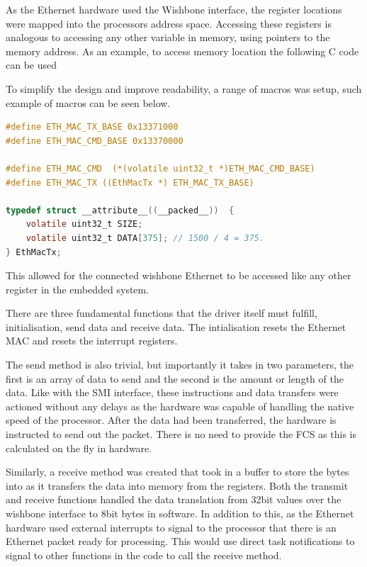As the Ethernet hardware used the Wishbone interface, the register locations were mapped into the processors address space. Accessing these registers is analogous to accessing any other variable in memory, using pointers to the memory address. As an example, to access memory location  the following C code can be used 


To simplify the design and improve readability, a range of macros was setup, such example of macros can be seen below. 

\begin{lstlisting}[language=C, caption=Python example]
#define ETH_MAC_TX_BASE 0x13371000
#define ETH_MAC_CMD_BASE 0x13370000

#define ETH_MAC_CMD  (*(volatile uint32_t *)ETH_MAC_CMD_BASE)
#define ETH_MAC_TX ((EthMacTx *) ETH_MAC_TX_BASE)

typedef struct __attribute__((__packed__))  {
    volatile uint32_t SIZE;
    volatile uint32_t DATA[375]; // 1500 / 4 = 375.
} EthMacTx;
\end{lstlisting}

This allowed for the connected wishbone Ethernet to be accessed like any other register in the embedded system. 


There are three fundamental functions that the driver itself must fulfill, initialisation, send data and receive data. The intialisation resets the Ethernet MAC and resets the interrupt registers. 

The send method is also trivial, but importantly it takes in two parameters, the first is an array of data to send and the second is the amount or length of the data. Like with the SMI interface, these instructions and data transfers were actioned without any delays as the hardware was capable of handling the native speed of the processor. After the data had been transferred, the hardware is instructed to send out the packet. There is no need to provide the FCS as this is calculated on the fly in hardware. 

Similarly, a receive method was created that took in a buffer to store the bytes into as it transfers the data into memory from the registers. Both the transmit and receive functions handled the data translation from 32bit values over the wishbone interface to 8bit bytes in software. In addition to this, as the Ethernet hardware used external interrupts to signal to the processor that there is an Ethernet packet ready for processing. This would use direct task notifications to signal to other functions in the code to call the receive method. 


